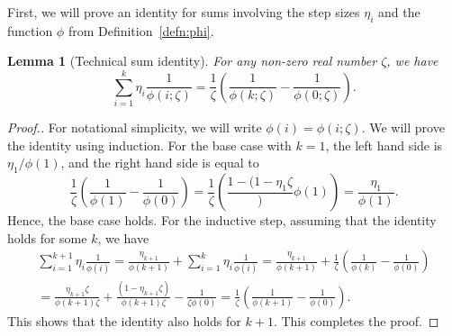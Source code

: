 \documentclass[11pt]{article}
\newtheorem{lemma}{Lemma}
\begin{document}
First, we will prove an identity for sums involving the step sizes $\eta_i$ and the function $\phi$ from Definition~\ref{defn:phi}.

\begin{lemma}[Technical sum identity] \label{lem:sum}
For any non-zero real number $\zeta$, we have
\[
    \sum_{i=1}^k \eta_i \frac{1}{\phi(i; \zeta)} = \frac{1}{\zeta} \left( \frac{1}{\phi(k; \zeta)} - \frac{1}{\phi(0; \zeta)} \right).
\]
\end{lemma}

\begin{proof}[Proof.]
For notational simplicity, we will write $\phi(i) = \phi(i; \zeta)$. We will prove the identity using induction.
For the base case with $k = 1$, the left hand side is $\eta_1 / \phi(1)$, and the right hand side is equal to
\[
    \frac{1}{\zeta}\left(\frac{1}{\phi(1)} - \frac{1}{\phi(0)}\right) = \frac{1}{\zeta}\left(\frac{1 - (1-\eta_1 \zeta}){\phi(1)}\right) = \frac{\eta_1}{\phi(1)}.
\]
Hence, the base case holds.
For the inductive step, assuming that the identity holds for some $k$, we have
\begin{multline*}
    \sum_{i=1}^{k+1}\eta_i \frac{1}{\phi(i)}
    = \frac{\eta_{k+1}}{\phi(k+1)} + \sum_{i=1}^k \eta_i \frac{1}{\phi(i)}
    = \frac{\eta_{k+1}}{\phi(k+1)} + \frac{1}{\zeta}\left(\frac{1}{\phi(k)} - \frac{1}{\phi(0)}\right) \\
    = \frac{\eta_{k+1} \zeta}{\phi(k+1) \zeta} + \frac{(1 - \eta_{k+1} \zeta)}{\phi(k+1) \zeta} - \frac{1}{\zeta \phi(0)}
    = \frac{1}{\zeta}\left(\frac{1}{\phi(k+1)} - \frac{1}{\phi(0)}\right).
\end{multline*}
This shows that the identity also holds for $k+1$. This completes the proof.
\end{proof}
\end{document}
